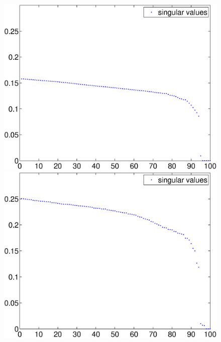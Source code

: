 \begin{figure}[t]
\centering
\begin{minipage}{.492\columnwidth}
  \centering
  \includegraphics[width=\columnwidth]
    {fig/straight-path-noisefree-svd-scaled.eps}
\end{minipage}
\begin{minipage}{.492\columnwidth}
  \centering
  \includegraphics[width=\columnwidth]
    {fig/straight-path-svd-scaled.eps}
\end{minipage}
\begin{minipage}{.492\columnwidth}
  \centering

\end{minipage}
\end{figure}
